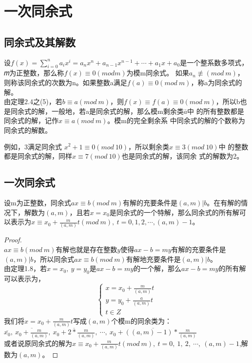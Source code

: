 \documentclass[cn,10pt]{elegantbook}
\begin{document}
\section{一次同余式}
\subsection{同余式及其解数}
\begin{definition}[同余式及其解数]
设$f(x) = \sum_{i=0}^n a_ix^i = a_nx^n + a_{n-1}x^{n-1}+ \cdots +a_1x +a_0$是一个整系数多项式，𝑚为正整数，那么称$f(x) \equiv 0(mod m)$为模m同余式。
如果$a_n \not\equiv (mod\ m)$，则称该同余式的次数为n。如果整数a满足$f(a) \equiv 0(mod \ m)$，称a为同余式的解。
\\ 由定理2.4之(5)，若$b \equiv a(mod\ m)$，则$f(x) \equiv f(a) \equiv 0(mod\ m)$，所以b也是同余式的解，一般地，若a是同余式的解，那么模m剩余类$\bar{a}$中
的所有整数都是同余式的解，记作$x \equiv a(mod\ m)$。模m的完全剩余系
中同余式的解的个数称为同余式的解数。
\end{definition}
\vskip 0.5cm
例如，3满足同余式
$x^2 + 1 \equiv 0(mod\ 1 0)$，所以剩余类$x \equiv 3(mod\ 1 0)$中
的整数都是同余式的解，同样$x \equiv 7(mod\ 1 0)$也是同余式的解，该同余
式的解数为2。
\subsection{一次同余式}
\begin{theorem}
  设m为正整数，同余式$ax \equiv b(mod \ m)$有解的充要条件是$(a,m) | b$。在有解的情况下，解数为$(a,m)$，且若$x = x_0$是同余式的一个特解，那么同余式的所有解可以表示为$x \equiv x_0+ \frac{m}{(a,m)}t(mod \ m), \ t =0,1,2, \cdots, (a,m)-1$。
\end{theorem}
\begin{proof}
  \\$ax \equiv b(mod\ m)$有解也就是存在整数$y$使得$ax-b = my$有解的充要条件是$(a,m)|b$，所以同余式$ax \equiv b(mod\ m)$有解地充要条件是$(a,m)|b$。
  \\由定理1.8，若$x = x_0,\ y = y_0$是$ax-b = my $的一个解，那么$ax - b = my$的所有解可以表示为，
  \[
    \begin{cases}
      x = x_0+ \frac{m}{(a,m)}t
      \\y = y_0+ \frac{a}{(a,m)}t
      \\t \in Z
    \end{cases}
  \]
  我们将$x = x_0 + \frac{m}{(a,m)}t$写成$(a,m)$个模m的同余类为：
  \\$\overline{x_0},\ \overline{x_0+\frac{m}{(a,m)}},\ \overline{x_0+2*\frac{m}{(a,m)}} ,\ \cdots ,\ \overline{x_0+((a,m)-1)*\frac{m}{(a,m)}}$
  \\或者说原同余式的解为$x \equiv x_0 + \frac{m}{(a,m)} t(mod\ m),\ t = 0,\ 1,\ 2,\ \cdots ,\ (a,m)-1$,解数为$(a,m)$。
\end{proof}
\end{document}
